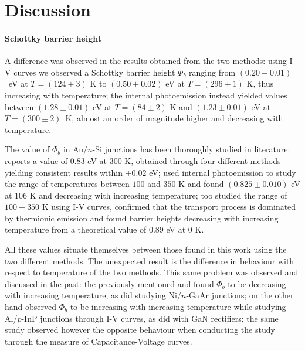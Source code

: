 \newpage %

\section{Discussion}
\paragraph{Schottky barrier height} A difference was observed in the results obtained from the two me\-thods:
using I-V curves we observed a Schottky barrier height $\Phi_b$ ranging from \mbox{$(0.20 \pm 0.01)$ eV} at $T = (124 \pm 3)$ K to $(0.50 \pm 0.02)$ eV at $T = (296 \pm 1)$ K, thus increasing with temperature; 
the internal photoemission instead yielded values between $(1.28 \pm 0.01)$ eV at $T = (84 \pm 2)$ K and $(1.23 \pm 0.01)$ eV at \mbox{$T = (300 \pm 2)$ K}, almost an order of magnitude higher and decreasing with temperature.

The value of $\Phi_b$ in Au/$n$-Si junctions has been thoroughly studied in literature: 
\cite{sze_physics_2007} reports a value of $0.83$ eV at 300 K, obtained through four different methods yielding consistent results within $\pm 0.02$ eV; 
\cite{crowell_equality_1964} used internal photoemission to study the range of temperatures between $100$ and $350$ K and found $(0.825 \pm 0.010)$ eV at $106$ K and decreasing with increasing temperature; 
\cite{arizumi_transport_1969} too studied the range {of} $100-350$ K using I-V curves, confirmed that the transport process is dominated by thermionic emission and found barrier heights decreasing with increasing temperature from a theoretical value of $0.89$ eV at $0$ K.

All these values situate themselves between those found in this work using the two different methods. {The unexpected result} is the difference in behaviour with respect to temperature of the two methods.
This same problem was observed and discussed in the past:
the previously mentioned \cite{crowell_equality_1964} and \cite{arizumi_transport_1969} found $\Phi_b$ to be decreasing with increasing temperature, as did \cite{hackam_electrical_1972} studying Ni/$n$-GaAr junctions;
\cite{yildirim_temperature-dependent_2010} on the other hand observed $\Phi_b$ to be increasing with increasing temperature while studying Al/$p$-InP junctions through I-V curves, as did \cite{zhou_temperature-dependent_2007} with GaN rectifiers; the same study observed however the opposite behaviour when conducting the study through the measure of Capacitance-Voltage curves.

